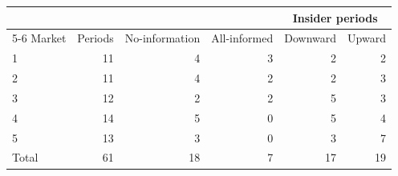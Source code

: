 \begin{tabular}{lrrrrr}
\toprule
 & & & & \multicolumn{2}{c}{Insider periods} \\
\cmidrule(lr){5-6}
Market & Periods & No-information & All-informed & Downward & Upward \\
\midrule
1 & 11 & 4 & 3 & 2 & 2 \\
2 & 11 & 4 & 2 & 2 & 3 \\
3 & 12 & 2 & 2 & 5 & 3 \\
4 & 14 & 5 & 0 & 5 & 4 \\
5 & 13 & 3 & 0 & 3 & 7 \\
\midrule
Total & 61 & 18 & 7 & 17 & 19 \\
\bottomrule
\end{tabular}
